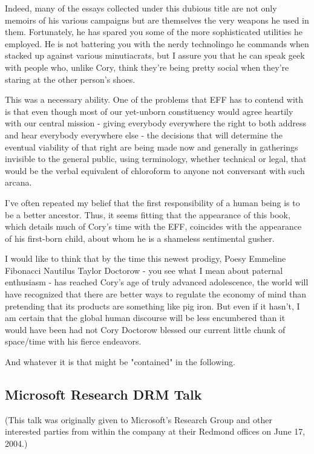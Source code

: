 Indeed, many of the essays collected under this dubious title are
not only memoirs of his various campaigns but are themselves the
very weapons he used in them. Fortunately, he has spared you some
of the more sophisticated utilities he employed. He is not
battering you with the nerdy technolingo he commands when stacked
up against various minutiacrats, but I assure you that he can speak
geek with people who, unlike Cory, think they're being pretty
social when they're staring at the other person's shoes.

This was a necessary ability. One of the problems that EFF has to
contend with is that even though most of our yet-unborn
constituency would agree heartily with our central mission - giving
everybody everywhere the right to both address and hear everybody
everywhere else - the decisions that will determine the eventual
viability of that right are being made now and generally in
gatherings invisible to the general public, using terminology,
whether technical or legal, that would be the verbal equivalent of
chloroform to anyone not conversant with such arcana.

I've often repeated my belief that the first responsibility of a
human being is to be a better ancestor. Thus, it seems fitting that
the appearance of this book, which details much of Cory's time with
the EFF, coincides with the appearance of his first-born child,
about whom he is a shameless sentimental gusher.

I would like to think that by the time this newest prodigy, Poesy
Emmeline Fibonacci Nautilus Taylor Doctorow - you see what I mean
about paternal enthusiasm - has reached Cory's age of truly
advanced adolescence, the world will have recognized that there are
better ways to regulate the economy of mind than pretending that
its products are something like pig iron. But even if it hasn't, I
am certain that the global human discourse will be less encumbered
than it would have been had not Cory Doctorow blessed our current
little chunk of space/time with his fierce endeavors.

And whatever it is that might be "contained" in the following.

\subsection{Microsoft Research DRM Talk}

(This talk was originally given to Microsoft's Research Group and
other interested parties from within the company at their Redmond
offices on June 17, 2004.)

